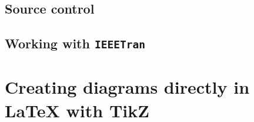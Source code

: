   \subsection{Source control}

  \subsection{Working with \texttt{IEEETran}}

  \section{Creating diagrams directly in LaTeX with TikZ}

